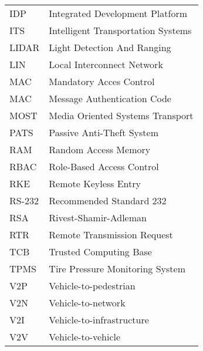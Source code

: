 \documentclass[master=cws,masteroption=vs,english]{kulemt}
\begin{document}
	\begin{tabularx}{\textwidth}{@{}p{14mm}X@{}}
	IDP & Integrated Development Platform \\
	ITS & Intelligent Transportation Systems \\
	LIDAR & Light Detection And Ranging \\
	LIN & Local Interconnect Network \\
	MAC & Mandatory Acces Control \\
	MAC & Message Authentication Code \\
	MOST & Media Oriented Systems Transport \\
	PATS & Passive Anti-Theft System \\
	RAM & Random Access Memory \\
	RBAC & Role-Based Access Control \\
	RKE & Remote Keyless Entry \\
	RS-232 & Recommended Standard 232 \\
	RSA & Rivest-Shamir-Adleman \\
	RTR & Remote Transmission Request \\
	TCB & Trusted Computing Base \\
	TPMS & Tire Pressure Monitoring System \\
	V2P & Vehicle-to-pedestrian \\
	V2N & Vehicle-to-network \\
	V2I & Vehicle-to-infrastructure  \\
	V2V & Vehicle-to-vehicle \\
	\end{tabularx}


\mainmatter









\backmatter



\end{document}

